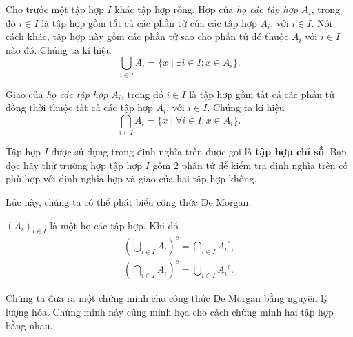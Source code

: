 \begin{definition}
    Cho trước một tập hợp $I$ khác tập hợp rỗng. Hợp của \textit{họ các tập hợp $A_{i}$}, trong đó $i\in I$ là tập hợp gồm tất cả các phần tử của các tập hợp $A_{i}$, với $i\in I$. Nói cách khác, tập hợp này gồm các phần tử sao cho phần tử đó thuộc $A_{i}$ với $i\in I$ nào đó. Chúng ta kí hiệu
    \[
        \bigcup_{i\in I}A_{i} = \{ x \mid \exists i\in I: x\in A_{i} \}.
    \]

    Giao của \textit{họ các tập hợp $A_{i}$}, trong đó $i\in I$ là tập hợp gồm tất cả các phần tử đồng thời thuộc tất cả các tập hợp $A_{i}$, với $i\in I$. Chúng ta kí hiệu
    \[
        \bigcap_{i\in I}A_{i} = \{ x \mid \forall i\in I: x\in A_{i} \}.
    \]
\end{definition}

Tập hợp $I$ được sử dụng trong định nghĩa trên được gọi là \textbf{tập hợp chỉ số}. Bạn đọc hãy thử trường hợp tập hợp $I$ gồm $2$ phần tử để kiểm tra định nghĩa trên có phù hợp với định nghĩa hợp và giao của hai tập hợp không.

Lúc này, chúng ta có thể phát biểu công thức De Morgan.

\begin{theorem}\label{theorem:de-morgan-formula}
    ${(A_{i})}_{i\in I}$ là một họ các tập hợp. Khi đó
    \begin{equation*}
        \begin{split}
            {\left(\bigcup_{i\in I}A_{i}\right)}^{c} = \bigcap_{i\in I}{A_{i}}^{c}, \\
            {\left(\bigcap_{i\in I}A_{i}\right)}^{c} = \bigcup_{i\in I}{A_{i}}^{c}.
        \end{split}
    \end{equation*}
\end{theorem}

\noindent Chúng ta đưa ra một chứng minh cho công thức De Morgan bằng nguyên lý lượng hóa. Chứng minh này cũng minh họa cho cách chứng minh hai tập hợp bằng nhau.

